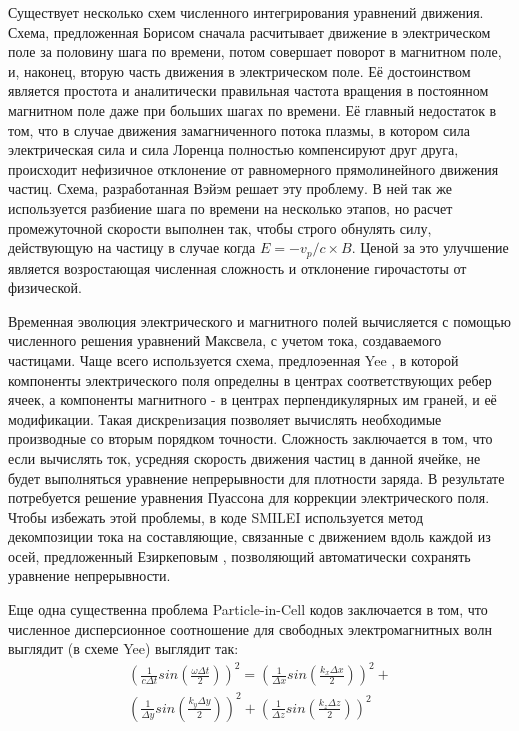 Существует несколько схем численного интегрирования уравнений движения. Схема, предложенная Борисом \cite{Boris} сначала расчитывает движение в электрическом поле за половину шага по времени, потом совершает поворот в магнитном поле, и, наконец, вторую часть движения в электрическом поле. Её достоинством является простота и аналитически правильная частота вращения в постоянном магнитном поле даже при больших шагах по времени. Её главный недостаток в том, что в случае движения замагниченного потока плазмы, в котором сила электрическая сила и сила Лоренца полностью компенсируют друг друга, происходит нефизичное отклонение от равномерного прямолинейного движения частиц. Схема, разработанная Вэйэм \cite{Vay} решает эту проблему. В ней так же используется разбиение шага по времени на несколько этапов, но расчет промежуточной скорости выполнен так, чтобы строго обнулять силу, действующую на частицу в случае когда $E = -v_p/c \times B$. Ценой за это улучшение является возростающая численная сложность и отклонение гирочастоты от физической.

Временная эволюция электрического и магнитного полей вычисляется с помощью численного решения уравнений Максвела, с учетом тока, создаваемого частицами. Чаще всего используется схема, предлоэенная Yee \cite{Yee}, в которой компоненты электрического поля определны в центрах соответствующих ребер ячеек, а компоненты магнитного - в центрах перпендикулярных им граней, и её модификации. Такая дискреnизация позволяет вычислять необходимые производные со вторым порядком точности. Сложность заключается в том, что если вычислять ток, усредняя скорость движения частиц в данной ячейке, не будет выполняться уравнение непрерывности для плотности заряда. В результате потребуется решение уравнения Пуассона для коррекции электрического поля. Чтобы избежать этой проблемы, в коде SMILEI используется метод декомпозиции тока на составляющие, связанные с движением вдоль каждой из осей, предложенный Езиркеповым \cite{Esirkepov}, позволяющий автоматически сохранять уравнение непрерывности.

Еще одна существенна проблема Particle-in-Cell кодов заключается в том, что численное дисперсионное соотношение для свободных электромагнитных волн выглядит (в схеме Yee) выглядит так:
 \begin{equation} \label{dispersion}
 	\begin{split}
 	\left(\frac{1}{c\Delta t}sin\left(\frac{\omega \Delta t}{2}\right)\right)^2 = \left(\frac{1}{\Delta x}sin\left(\frac{k_x \Delta x}{2}\right)\right)^2 +\\ \left(\frac{1}{\Delta y}sin\left(\frac{k_y \Delta y}{2}\right)\right)^2 + \left(\frac{1}{\Delta z}sin\left(\frac{k_z \Delta z}{2}\right)\right)^2
 	\end{split}
 \end{equation}

